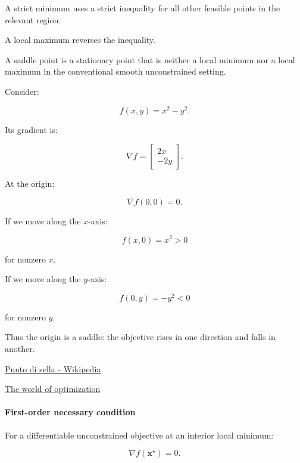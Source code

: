 A strict minimum uses a strict inequality for all other feasible points in the relevant region.

A local maximum reverses the inequality.

A saddle point is a stationary point that is neither a local minimum nor a local maximum in the conventional smooth unconstrained setting.

Consider:

\[
f(x,y)=x^2-y^2.
\]

Its gradient is:

\[
\nabla f= \begin{bmatrix} 2x\\-2y \end{bmatrix}.
\]

At the origin:

\[
\nabla f(0,0)=0.
\]

If we move along the \(x\)-axis:

\[
f(x,0)=x^2>0
\]

for nonzero \(x\).

If we move along the \(y\)-axis:

\[
f(0,y)=-y^2<0
\]

for nonzero \(y\).

Thus the origin is a saddle: the objective rises in one direction and falls in another.

\href{https://images.openai.com/static-rsc-4/IqMqjdabbXp9lgF1Y59BWcBJuurZz0BV9d1Mv_AppeNOVYVoRQPuuV61Cf6TJAGqRi-DqMXoElE3-r5maVwHTXuo83A0mjM4FaBadvF4zNjF2LeOOzMjujVpT69hboVYADw65CSdRZt7hW_eNVx2xfRet5TkDNIoAwZTLnVQSgY?purpose=inline}{Punto di sella - Wikipedia}

\href{https://images.openai.com/static-rsc-4/2hdI6qSb-Gmq24hva1IPzdMch7SbSaYVsYlCAepKmsA3SZDPddxqa6DCww0y-FyOpM9G78ABWGxf3MsZs07Pfn1BlWk34xJqOTG0ScUe2i3GJrc8HXVjsf5kBDzuZpsfQjpbPkJbrEk2b-r1gAKcleVv-hPxqzAz9Qwbl9J2BsI?purpose=inline}{The world of optimization}

\paragraph{First-order necessary condition}\label{02-foundations-ii-ch026-first-order-necessary-condition}

\hypertarget{02-foundations-ii-ch026-first-order-necessary-condition}{}

For a differentiable unconstrained objective at an interior local minimum:

\[
\boxed{\nabla f(\mathbf x^\star)=0}.
\]

